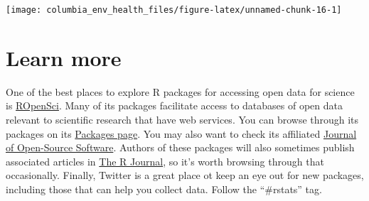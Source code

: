 \documentclass[]{tufte-book}
\begin{document}
\begin{center}\texttt{[image: columbia\_env\_health\_files/figure-latex/unnamed-chunk-16-1]} \end{center}

\hypertarget{learn-more-3}{%
\section{Learn more}\label{learn-more-3}}

One of the best places to explore R packages for accessing open data for science is
\href{https://ropensci.org/}{ROpenSci}.
Many of its packages facilitate access to databases of open data relevant to scientific
research that have web services. You can browse through its packages on
its \href{https://ropensci.org/packages/}{Packages page}. You may also want to
check its affiliated \href{https://joss.theoj.org/}{Journal of Open-Source Software}.
Authors of these packages will also sometimes publish associated articles in
\href{https://journal.r-project.org/}{The R Journal}, so it's worth browsing through
that occasionally.
Finally, Twitter is a great place ot keep an eye out for new packages, including
those that can help you collect data. Follow the ``\#rstats'' tag.


\end{document}
